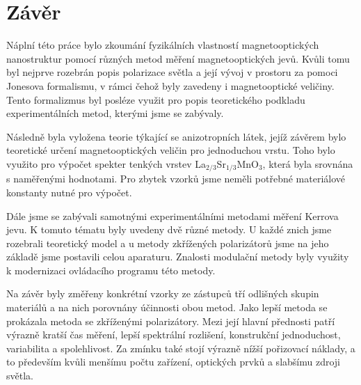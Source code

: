 \chapter*{Závěr}

Náplní této práce bylo zkoumání fyzikálních vlastností magnetooptických nanostruktur pomocí různých metod měření magnetooptických jevů. Kvůli tomu byl nejprve rozebrán popis polarizace světla 
a její vývoj v prostoru za pomoci Jonesova formalismu, v rámci čehož byly zavedeny i magnetooptické veličiny. Tento formalizmus 
byl posléze využit pro popis teoretického podkladu experimentálních metod, kterými jsme se zabývaly.

Následně byla vyložena teorie týkající se anizotropních látek, jejíž závěrem bylo teoretické určení magnetooptických veličin pro jednoduchou 
vrstu. Toho bylo využito pro výpočet spekter tenkých vrstev La$_{2/3}$Sr$_{1/3}$MnO$_3$, která byla srovnána s naměřenými hodnotami. 
Pro zbytek vzorků jsme neměli potřebné materiálové konstanty nutné pro výpočet.

Dále jsme se zabývali samotnými experimentálními metodami měření Kerrova jevu. K tomuto tématu byly uvedeny dvě různé metody. U každé znich 
jsme rozebrali teoretický model a u metody zkřížených polarizátorů jsme na jeho základě jsme postavili celou aparaturu. 
Znalosti modulační metody byly využity k modernizaci ovládacího programu této metody.

Na závěr byly změřeny konkrétní vzorky ze zástupců tří odlišných skupin materiálů a na nich porovnány účinnosti obou metod. Jako lepší metoda
se prokázala metoda se zkříženými polarizátory. Mezi její hlavní přednosti patří výrazně kratší čas měření, lepší spektrální rozlišení, 
konstrukční jednoduchost, variabilita a spolehlivost. Za zmínku také stojí výrazně nížší pořizovací náklady, a to především kvůli menšímu počtu 
zařízení, optických prvků a slabšímu zdroji světla.
